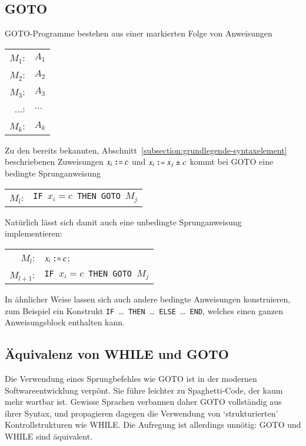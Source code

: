 \subsection{GOTO}
%
GOTO-Programme bestehen aus einer markierten Folge von Anweisungen
\begin{center}
\begin{tabular}{rl}
$M_1$:&$A_1$\\
$M_2$:&$A_2$\\
$M_3$:&$A_3$\\
$\dots$:&$\dots$\\
$M_k$:&$A_k$
\end{tabular}
\end{center}
Zu den bereits bekannten,
Abschnitt~\ref{subsection:grundlegende-syntaxelement} beschriebenen
Zuweisungen
$x_i \mathbin{\texttt{:=}} c$ 
und
$x_i \mathbin{\texttt{:=}} x_j \pm c$ 
kommt bei GOTO eine bedingte Sprunganweisung
\begin{center}
\begin{tabular}{rl}
$M_l$:&{\tt IF\ }$x_i=c${\tt\ THEN GOTO\ }$M_j$
\end{tabular}
\end{center}
Natürlich lässt sich damit auch eine unbedingte Sprunganweisung
implementieren:
\begin{center}
\begin{tabular}{rl}
$M_l$:&$x_i \mathbin{\texttt{:=}} c$;\\
$M_{l+1}$:&{\tt IF\ }$x_i=c${\tt\ THEN GOTO\ }$M_j$
\end{tabular}
\end{center}
In ähnlicher Weise lassen sich auch andere bedingte Anweisungen
konstruieren, zum Beispiel ein
Konstrukt {\tt IF }\dots{\tt\ THEN }\dots{\tt\ ELSE }\dots{\tt\ END}, welches
einen ganzen Anweisungsblock enthalten kann.

\subsection{Äquivalenz von WHILE und GOTO}
Die Verwendung eines Sprungbefehles wie GOTO ist in der modernen
Softwareentwicklung verpönt. Sie führe leichter zu Spaghetti-Code,
der kaum mehr wartbar ist. Gewisse Sprachen verbannen daher
GOTO vollständig aus ihrer Syntax, und propagieren dagegen
die Verwendung von `strukturierten' Kontrollstrukturen wie
WHILE. Die Aufregung ist allerdings unnötig: GOTO und WHILE sind äquivalent.


